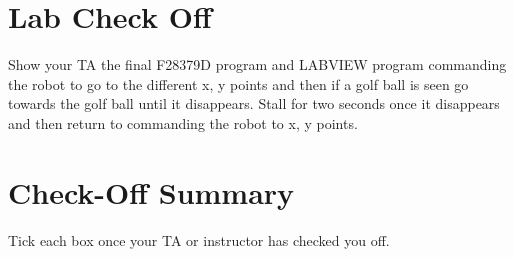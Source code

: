 \documentclass[11pt]{article}
\begin{document}
\section*{Lab Check Off}
%
\begin{checkoff}
        Show your TA the final F28379D program and LABVIEW program commanding the robot to go to the different x, y points and then if a golf ball is seen go towards the golf ball until it disappears. Stall for two seconds once it disappears and then return to commanding the robot to x, y points.
\end{checkoff}
%
\section*{Check-Off Summary}

Tick each box once your TA or instructor has checked you off.
%
\CheckOffSummary

\MakeFooter
\end{document}
